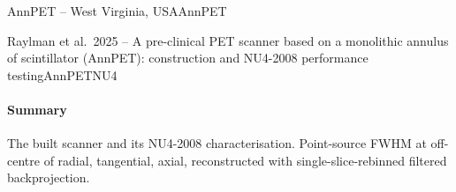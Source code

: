 \begin{programnote}{AnnPET -- West Virginia, USA}{AnnPET}
\begin{papernote}{Raylman et al.\ 2025 -- A pre-clinical PET scanner based on a monolithic annulus of scintillator (AnnPET): construction and NU4-2008 performance testing}{AnnPETNU4}
\paragraph{Summary}
The built scanner and its NU4-2008 characterisation. Point-source FWHM at
 off-centre of  radial,  tangential, 
axial, reconstructed with single-slice-rebinned filtered backprojection.

\end{papernote}
 
\end{programnote}
 
 
 
